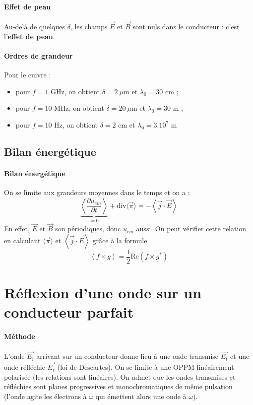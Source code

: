 \documentclass[french]{book}
\theoremstyle{plain}
\theoremstyle{definition}
\theoremstyle{remark}
\newcommand{\st}{^*}
\renewcommand{\div}{\text{div}}
\begin{document}
\paragraph{Effet de peau} Au-delà de quelques $\delta$, les champs $\overrightarrow{E}$ et $\overrightarrow{B}$ sont nuls dans le conducteur : c'est l'\textbf{effet de peau}.
\paragraph{Ordres de grandeur} Pour le cuivre :
\begin{itemize}
	\item pour $f=1$ GHz, on obtient $\delta=2\ \mu$m et $\lambda_0=30$ cm ;
	\item pour $f=10$ MHz, on obtient $\delta=20\ \mu$m et $\lambda_0=30$ m ;
	\item pour $f=10$ Hz, on obtient $\delta=2$ cm et $\lambda_0=3.10^7$ m
\end{itemize}
\subsection{Bilan énergétique}
\paragraph{Bilan énergétique} On se limite aux grandeurs moyennes dans le temps et on a : $$\underset{=0}{\underbrace{\left\langle\frac{\partial u_{em}}{\partial t}\right\rangle}}+\div\langle\overrightarrow{\pi}\rangle=-\left\langle\overrightarrow{j}\cdot\overrightarrow{E}\right\rangle$$ En effet, $\overrightarrow{E}$ et $\overrightarrow{B}$ son périodiques, donc $u_{em}$ aussi. On peut vérifier cette relation en calculant $\langle\overrightarrow{\pi}\rangle$ et $\left\langle\overrightarrow{j}\cdot\overrightarrow{E}\right\rangle$ grâce à la formule $$\left\langle f\times g\right\rangle=\frac12\text{Re}\left(\underline{f}\times\underline{g}\st\right)$$

\section{Réflexion d'une onde sur un conducteur parfait}
\paragraph{Méthode} L’onde $\overrightarrow{E_i}$ arrivant sur un conducteur donne lieu à une onde transmise $\overrightarrow{E_t}$ et une onde réfléchie $\overrightarrow{E_r}$ (loi de Descartes). On se limite à une OPPM linéairement polarisée (les relations sont linéaires). On admet que les ondes transmises et réfléchies sont planes progressives et monochromatiques de même pulsation (l’onde agite les électrons à $\omega$ qui émettent alors une onde à $\omega$).
\end{document}
